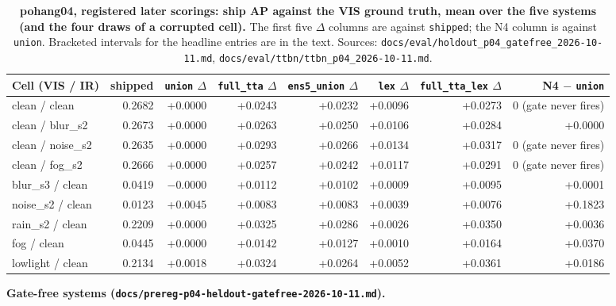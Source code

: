 \documentclass[10pt]{article}
\begin{document}
\begin{table}[htbp]
\centering
\footnotesize
\caption{\textbf{pohang04, registered later scorings: ship AP against the VIS ground truth, mean over the five systems (and the four draws of a corrupted cell).} The first five $\Delta$ columns are against \texttt{shipped}; the N4 column is against \texttt{union}. Bracketed intervals for the headline entries are in the text. Sources: \texttt{docs/\allowbreak{}eval/\allowbreak{}holdout\_\allowbreak{}p04\_\allowbreak{}gatefree\_\allowbreak{}2026-10-11.md}, \texttt{docs/\allowbreak{}eval/\allowbreak{}ttbn/\allowbreak{}ttbn\_\allowbreak{}p04\_\allowbreak{}2026-10-11.md}.}
\label{tab:9}
\setlength{\tabcolsep}{3pt}
\begin{adjustbox}{max width=\linewidth}
\begin{tabular}{lrrrrrrr}
\toprule
Cell (VIS / IR) & shipped & \texttt{union} $\Delta$ & \texttt{full\_\allowbreak{}tta} $\Delta$ & \texttt{ens5\_\allowbreak{}union} $\Delta$ & \texttt{lex} $\Delta$ & \texttt{full\_\allowbreak{}tta\_\allowbreak{}lex} $\Delta$ & N4 $-$ \texttt{union} \\
\midrule
clean / clean & 0.2682 & +0.0000 & +0.0243 & +0.0232 & +0.0096 & +0.0273 & 0 (gate never fires) \\
clean / blur\_s2 & 0.2673 & +0.0000 & +0.0263 & +0.0250 & +0.0106 & +0.0284 & +0.0000 \\
clean / noise\_s2 & 0.2635 & +0.0000 & +0.0293 & +0.0266 & +0.0134 & +0.0317 & 0 (gate never fires) \\
clean / fog\_s2 & 0.2666 & +0.0000 & +0.0257 & +0.0242 & +0.0117 & +0.0291 & 0 (gate never fires) \\
blur\_s3 / clean & 0.0419 & $-$0.0000 & +0.0112 & +0.0102 & +0.0009 & +0.0095 & +0.0001 \\
noise\_s2 / clean & 0.0123 & +0.0045 & +0.0083 & +0.0083 & +0.0039 & +0.0076 & +0.1823 \\
rain\_s2 / clean & 0.2209 & +0.0000 & +0.0325 & +0.0286 & +0.0026 & +0.0350 & +0.0036 \\
fog / clean & 0.0445 & +0.0000 & +0.0142 & +0.0127 & +0.0010 & +0.0164 & +0.0370 \\
lowlight / clean & 0.2134 & +0.0018 & +0.0324 & +0.0264 & +0.0052 & +0.0361 & +0.0186 \\
\bottomrule
\end{tabular}
\end{adjustbox}
\end{table}
\textbf{Gate-free systems (\texttt{docs/\allowbreak{}prereg-p04-heldout-gatefree-2026-10-11.md}).}
\end{document}
